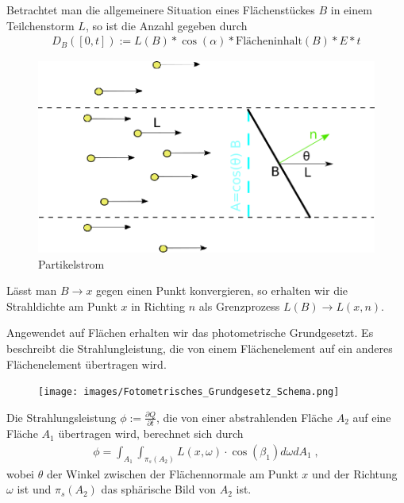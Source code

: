  Betrachtet man die allgemeinere Situation eines Flächenstückes $B$  in einem Teilchenstorm $L$, so ist die Anzahl gegeben durch 
\begin{align}
D_B([0,t]) :=L(B) * \cos(\alpha) *  \text{Flächeninhalt} (B) *   E * t
 \end{align}
\begin{figure}[H]
    \centering
    \includegraphics[width=1.0\textwidth]{images/Strahldichte.png}
    \caption{Partikelstrom}
    \label{fig:cray}
\end{figure}

Lässt man $B \to x$ gegen einen Punkt konvergieren, so erhalten wir die Strahldichte  am Punkt $x$ in Richting $n$ als Grenzprozess  $L(B) \to L(x, n)$.


Angewendet  auf Flächen erhalten wir das  photometrische Grundgesetzt. Es beschreibt die Strahlungleistung, die von einem  Flächenelement auf ein anderes  Flächenelement übertragen wird.

   \begin{figure}[H] 
    \centering
  
    \texttt{[image: images/Fotometrisches\_Grundgesetz\_Schema.png]}
    \label{fig:shadowmap1}
      \end{figure}
  


\begin{Satz}
Die Strahlungsleistung $\phi:= \frac{ \partial Q}{\partial t}$, die von einer abstrahlenden Fläche $A_2$  auf eine Fläche $A_1$ übertragen wird, berechnet sich durch
\begin{align}
\phi = \int_{A_1} \int_{\pi_s(A_2)} L(x, \omega)\cdot \cos(\beta_1) d\omega  dA_1   \; ,
\end{align}
wobei $\theta$ der Winkel zwischen der Flächennormale am Punkt $x$ und der Richtung $\omega$ ist und $\pi_s(A_2)$ das sphärische Bild von $A_2$ ist.
\end{Satz}

